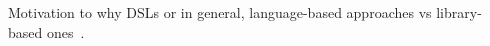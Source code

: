 \blindtext
Motivation to why DSLs or in general, language-based approaches vs library-based ones~\cite{tasharofi2013scala}.
